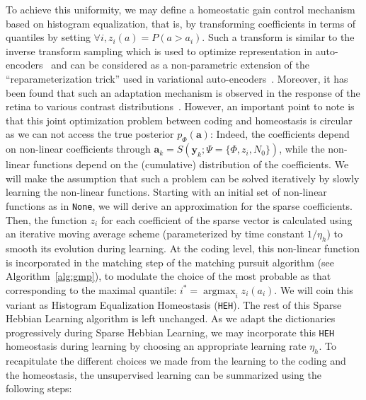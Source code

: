 \documentclass[vision,article,submit,oneauthor,pdftex]{Definitions/mdpi}
\DeclareMathOperator*{\ArgMax}{\arg\max}   %
\newcommand{\coef}{\mathbf{a}} %
\newcommand{\image}{\mathbf{y}} %
\newcommand{\dico}{\Phi} %
\begin{document}
{%
To achieve this uniformity, we may define a homeostatic gain control mechanism based on histogram equalization, that is, by transforming coefficients in terms of quantiles by setting $\forall i, z_i( a ) = P( a > a_i)$. Such a transform is similar to the inverse transform sampling which is used to optimize representation in auto-encoders~\citep{Doersch2016} and can be considered as a non-parametric extension of the ``reparameterization trick'' used in variational auto-encoders~\citep{Kingma13}. %
Moreover, it has been found that such an adaptation mechanism is observed in the response of the retina to various contrast distributions~\citep{Laughlin81}. However, an important point to note is that this joint optimization problem between coding and homeostasis is circular as we can not access the true posterior $p_\dico(\coef)$: Indeed, the coefficients depend on non-linear coefficients through $\coef_{k} = S(\image_k; \Psi=\{\dico, z_i, N_0\})$, while the non-linear functions depend on the (cumulative) distribution of the coefficients. We will make the assumption that such a problem can be solved iteratively by slowly learning the non-linear functions. Starting with an initial set of non-linear functions as in \texttt{None}, we will derive an approximation for the sparse coefficients. Then, the function $z_i$ for each coefficient of the sparse vector is calculated using an iterative moving average scheme (parameterized by time constant $1/\eta_h$) to smooth its evolution during learning. At the coding level, this non-linear function is incorporated in the matching step of the matching pursuit algorithm (see Algorithm~\ref{alg:gmp}), to modulate the choice of the most probable as that corresponding to the maximal quantile: $i^\ast = \ArgMax_i z_i(a_i)$. We will coin this variant as Histogram Equalization Homeostasis (\texttt{HEH}). The rest of this Sparse Hebbian Learning algorithm is left unchanged. As we adapt the dictionaries progressively during Sparse Hebbian Learning, we may incorporate this \texttt{HEH} homeostasis during learning by choosing an appropriate learning rate $\eta_h$.
To recapitulate the different choices we made from the learning to the coding and the homeostasis, the unsupervised learning can be summarized using the following steps:
\begin{algorithm}

\end{algorithm}}
\end{document}
